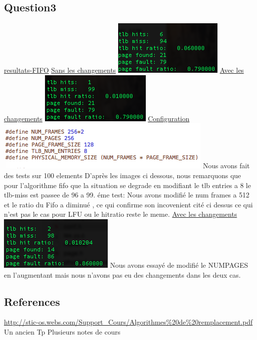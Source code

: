 \documentclass{article}
\begin{document}
\subsection{Question3}
\underline{resultats-FIFO} 
\newline
\underline{Sans les changements}
\newline 
\includegraphics{./images/fifo1.png}
\newline
\underline{Avec les changements}
\newline
\includegraphics{./images/fifo.png}
\newline
\underline{ Configuration} 
\newline
\includegraphics{./images/Fifoconf.png}
Nous avons fait des tests sur 100 elements
D'apr\`{e}s les images ci dessous, nous remarquons que pour l'algorithme fifo que la situation se degrade en modifiant le tlb entries a 8 le tlb-miss est passee de 96 a 99. 
 \'{e}me test:
\newline
Nous avons modifi\'{e} le num frames a 512 et le ratio du Fifo a diminu\'{e} , ce qui confirme son incovenient cit\'{e} ci dessus ce qui n'est pas le cas pour LFU ou le hitratio reste le meme.
\newline
\underline{Avec les changements}
\newline
\includegraphics{./images/CaptureAnomalie.png}
\newline
Nous avons essay\'{e} de modifi\'{e} le NUMPAGES en l'augmentant mais nous n'avons pas eu des changements dans les deux cas.
\subsection{References}
\url{http://stic-os.webs.com/Support_Cours/Algorithmes%20de%20remplacement.pdf}
\newline
Un ancien Tp
\newline
Plusieurs notes de cours
\end{document}
